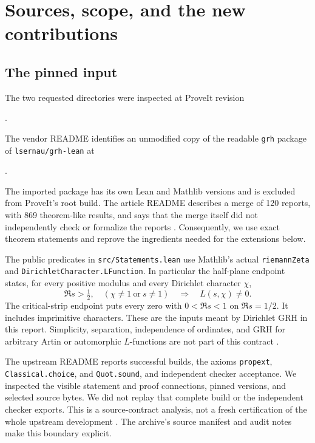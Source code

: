 \section{Sources, scope, and the new contributions}\label{sec:context}

\subsection{The pinned input}
The two requested directories were inspected at ProveIt revision
\begin{center}\small\sourcecommit.\end{center}
The vendor README identifies an unmodified copy of the readable
\texttt{grh} package of \nolinkurl{lsernau/grh-lean} at
\begin{center}\small\upstreamcommit.\end{center}
The imported package has its own Lean and Mathlib versions and is excluded
from ProveIt's root build. The article README describes a merge of 120
reports, with 869 theorem-like results, and says that the merge
itself did not independently check or formalize the reports
\cite{ProveItArticle,ProveItVendor}. Consequently, we use exact theorem
statements and reprove the ingredients needed for the extensions below.

The public predicates in \texttt{src/Statements.lean} use Mathlib's actual
\texttt{riemannZeta} and \texttt{DirichletCharacter.LFunction}.
In particular the half-plane endpoint states, for every positive modulus
and every Dirichlet character \(\chi\),
\[
 \Re s>\tfrac12,\quad (\chi\ne1\ \text{or}\ s\ne1)
 \quad\Longrightarrow\quad L(s,\chi)\ne0.
\]
The critical-strip endpoint puts every zero with \(0<\Re s<1\) on
\(\Re s=1/2\). It includes imprimitive characters. These are the inputs meant
by Dirichlet GRH in this report. Simplicity, separation, independence of
ordinates, and GRH for arbitrary Artin or automorphic \(L\)-functions are
not part of this contract \cite{SourceStatements}.

The upstream README reports successful builds, the axioms
\texttt{propext}, \texttt{Classical.choice}, and \texttt{Quot.sound}, and
independent checker acceptance. We inspected the visible statement and
proof connections, pinned versions, and selected source bytes. We did not
replay that complete build or the independent checker exports. This is a
source-contract analysis, not a fresh certification of the whole upstream
development \cite{SourceReadme}. The archive's source manifest and audit
notes make this boundary explicit.

